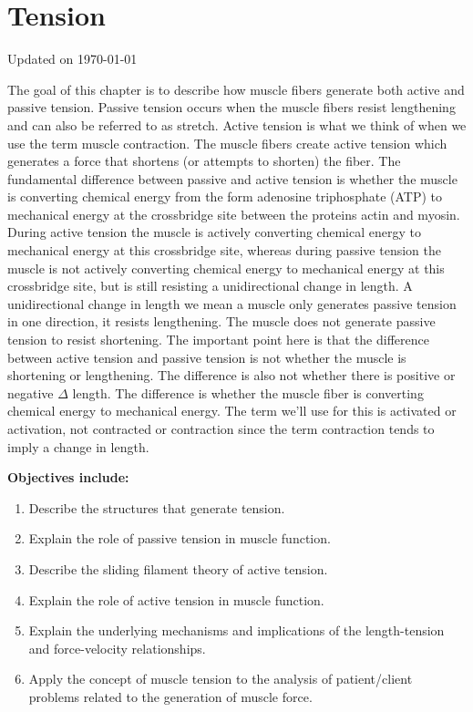 \chapter{Tension}\label{chp:tension}
Updated on \today
\minitoc

The goal of this chapter is to describe how muscle fibers generate both active and passive tension. Passive tension occurs when the muscle fibers resist lengthening and can also be referred to as stretch. Active tension is what we think of when we use the term muscle contraction. The muscle fibers create active tension which generates a force that shortens (or attempts to shorten) the fiber.  The fundamental difference between passive and active tension is whether the muscle is converting chemical energy from the form adenosine triphosphate (ATP) to mechanical energy at the crossbridge site between the proteins actin and myosin. During active tension the muscle is actively converting chemical energy to mechanical energy at this crossbridge site, whereas during passive tension the muscle is not actively converting chemical energy to mechanical energy at this crossbridge site, but is still resisting a unidirectional change in length. A unidirectional change in length we mean a muscle only generates passive tension in one direction, it resists lengthening. The muscle does not generate passive tension to resist shortening. The important point here is that the difference between active tension and passive tension is not whether the muscle is shortening or lengthening. The difference is also not whether there is positive or negative $\Delta$ length. The difference is whether the muscle fiber is converting chemical energy to mechanical energy. The term we’ll use for this is activated or activation, not contracted or contraction since the term contraction tends to imply a change in length. 

\vspace{5mm}

\textbf{Objectives include:}
\begin{enumerate}
    \item Describe the structures that generate tension.
    \item Explain the role of passive tension in muscle function.
    \item Describe the sliding filament theory of active tension.
    \item Explain the role of active tension in muscle function.
    \item Explain the underlying mechanisms and implications of the length-tension and force-velocity relationships.
   \item Apply the concept of muscle tension to the analysis of patient/client problems related to the generation of muscle force.
\end{enumerate}

